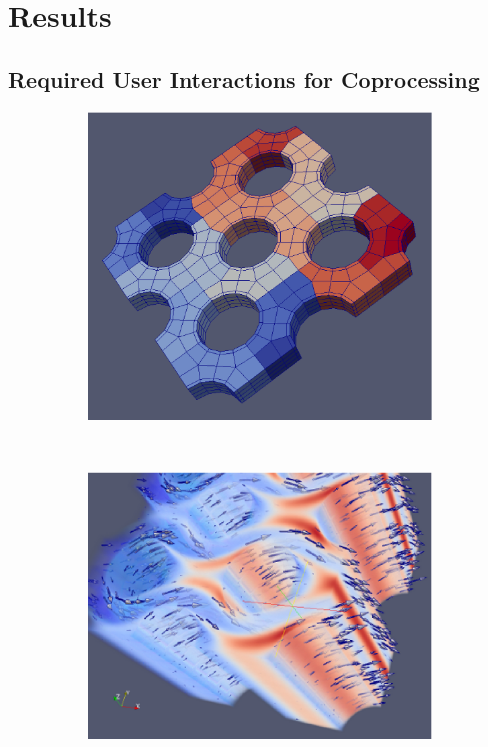 \section{Results}
\label{sec:results}

\subsection{Required User Interactions for Coprocessing}
   
\begin{figure}
  \centering
  \begin{subfigure}[b]{0.45\textwidth}
    \includegraphics[scale=0.195]{pictures/pieceofcake.eps}
    \label{fig:piece}
  \end{subfigure}
  ~
  \begin{subfigure}[b]{0.45\textwidth}
    \includegraphics[scale=0.41]{pictures/res.eps}

\end{subfigure}
\end{figure}
